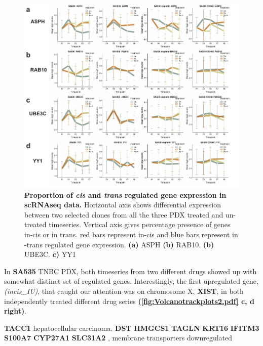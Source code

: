 \begin{figure}
\centering
  \includegraphics[width=\textwidth]{Figures/commongenesfromvolcanoplots.pdf}
	
\caption[Proportion of \textit{in-cis} and \textit{in-trans} regulated gene expression in scRNAseq data]
	{\small
	\textbf{Proportion of \textit{cis} and \textit{trans} regulated gene expression in scRNAseq data.}
	   Horizontal axis shows differential expression between two selected clones from all the three PDX treated and un-treated timeseries. Vertical axis gives percentage presence of genes in-cis or in trans. red bars represent in-cis and blue bars represent in -trans regulated gene expression.
	   \textbf{(a)} ASPH
	    \textbf{(b)} RAB10.
	    \textbf{(b)} UBE3C.
	     \textbf{c)} YY1
	}
	\label{fig:commongenesfromvolcanoplots}
\end{figure}




In \textbf{SA535} TNBC PDX, both timeseries from two different drugs showed up with somewhat distinct set of regulated genes. Interestingly, the first upregulated gene,\textit{(incis\_IU)}, that caught our attention was on chromosome X, \textbf{XIST}\cite{salama2020xist,chen2017long, chen2019up}, in both independently treated different drug series \textbf{(\autoref{fig:Volcanotrackplots2.pdf} c, d right)}.




\textbf{TACC1} \cite{shakya2018high} hepatocellular carcinoma.
\textbf{DST}  \cite{salerno2016human}
\textbf{HMGCS1} \cite{walsh2020mevalonate}
\textbf{TAGLN} \cite{wu2014transgelin, elsafadi2020transgelin}
\textbf{KRT16} \cite{huang2019novel}
\textbf{IFITM3} \cite{liu2019ifitm3}
\textbf{S100A7} \cite{zhang2019clinical, mayama2018olfm}
\textbf{CYP27A1}  \cite{liang2019cyp27a1, wu201327}
\textbf{SLC31A2} \cite{bai2017structural}, membrane transporters downregulated

